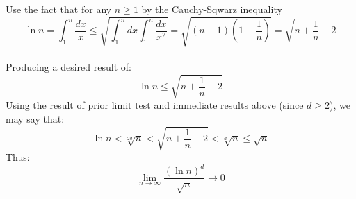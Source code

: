 \documentclass[12pt]{article}
\begin{document}
Use the fact that for any \begin{math} n  \geq 1\end{math} by the Cauchy-Sqwarz inequality\
\[\ln{n} = \int_{1}^{n} \frac{dx}{x} \leq \sqrt{\int_{1}^{n} dx \int_{1}^{n} \frac{dx}{x^2}} = \sqrt{(n-1)(1-\frac{1}{n})} = \sqrt{n + \frac{1}{n} - 2}\]\\
Producing a desired result of:
\[\ln{n} \leq \sqrt{n + \frac{1}{n} - 2}\]
Using the result of prior limit test and immediate results above (since \begin{math}d \geq 2\end{math}), we may say that:
\[\ln{n} < \sqrt[2d]{n} < \sqrt{n + \frac{1}{n} - 2} < \sqrt[d]{n} \leq \sqrt{n}\]
Thus:
\[\lim_{n\to\infty} \frac{(\ln{n})^d}{\sqrt{n}} \rightarrow 0\]
\end{document}

